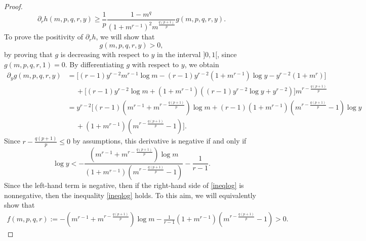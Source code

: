 \documentclass[10pt,a4paper]{amsart}
\newcommand{\de}{\partial}
\begin{document}
\begin{proof}
\begin{equation}
\de_{r}h (m,p,q,r,y) \ge \frac1p\frac{1-m^{q}}{(1+m^{r-1})^{2}m^{\frac {q(p+1)}p}} g(m,p,q,r,y).
\end{equation}
To prove the positivity of $\partial_r h$, we will show that
\begin{equation}
\label{segno_der_g}
g(m,p,q,r,y)>0,
\end{equation}
by proving that $g$ is decreasing with respect to $y$ in the interval $]0,1[$, since $g(m,p,q,r,1)=0$. By differentiating $g$ with respect to $y$, we obtain
\begin{equation*}
\begin{split}
\de_{y}g (m,p,q,r,y)& = \bigg[(r-1)y^{r-2}m^{r-1}\log m-(r-1)y^{r-2}(1+m^{r-1})\log y-y^{r-2}(1+m^{r})\bigg]\\
&\ \quad +\bigg[(r-1)y^{r-2}\log m+(1+m^{r-1})((r-1)y^{r-2}\log y+y^{r-2})\bigg]m^{r-\frac{q(p+1)}p}\\
& =y^{r-2}\bigg[(r-1) (m^{r-1} +m^{r-\frac{q(p+1)}p})\log m+(r-1)(1+m^{r-1})\left(m^{r-\frac{q(p+1)}p}-1\right)\log y  \\
&\ \quad +(1+m^{r-1})\left(m^{r-\frac{q(p+1)}p}-1\right)\bigg].
\end{split}
\end{equation*}
Since $r-\frac{q(p+1)}p\le  0$ by assumptions, this derivative is negative if and only if
\begin{equation}
\label{ineqlog}
\log y < -\frac{\left(m^{r-1}+m^{r-\frac{q(p+1)}p}\right)\log m}{\left(1+m^{r-1}\right)\left(m^{r-\frac{q(p+1)}p}-1\right)}-\frac1{r-1}. %
\end{equation}
Since the left-hand term is negative, then if the right-hand side of \eqref{ineqlog} is nonnegative, then the inequality \eqref{ineqlog} holds.
To this aim, we will equivalently show that
\begin{multline}\label{segno_f}
f(m,p,q,r):=-\left(m^{r-1}+m^{r-\frac{q(p+1)}p}\right)\log m - \frac1{r-1}\left(1+m^{r-1}\right)\left(m^{r-\frac{q(p+1)}p}-1\right) > 0.
\end{multline}

\end{proof}
\end{document}
